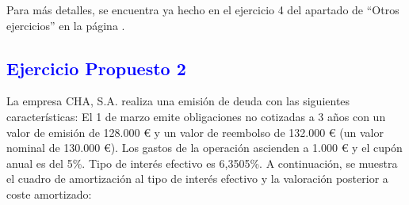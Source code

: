 \begin{enumerate}[label=\alph*)]





\begin{tcolorbox}[colframe=blue!30]
    Para más detalles, se encuentra ya hecho en el ejercicio 4 del apartado de ``Otros ejercicios'' en la página \pageref{sec:otros-ejercicios_ej4}.
\end{tcolorbox}

\end{enumerate}

\subsection*{\textcolor{blue}{Ejercicio Propuesto 2}}

La empresa CHA, S.A. realiza una emisión de deuda con las siguientes características: El 1 de marzo emite obligaciones no cotizadas a 3 años con un valor de emisión de 128.000 € y un valor de reembolso de 132.000 € (un valor nominal de 130.000 €). Los gastos de la operación ascienden a 1.000 € y el cupón anual es del 5\%. Tipo de interés efectivo es 6,3505\%. A continuación, se muestra el cuadro de amortización al tipo de interés efectivo y la valoración posterior a coste amortizado:

